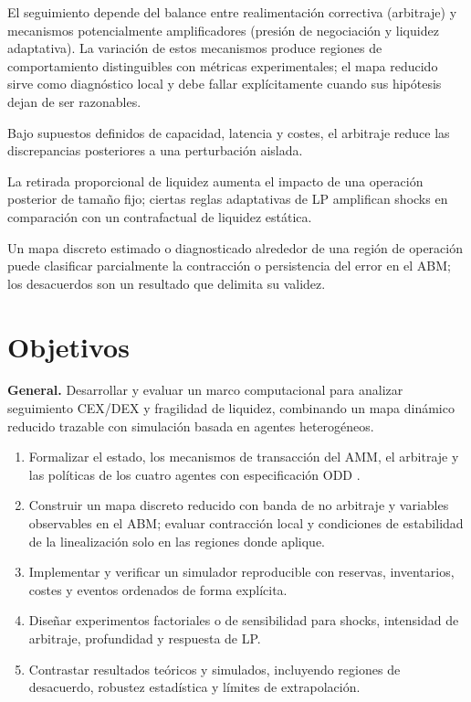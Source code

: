 El seguimiento depende del balance entre realimentación correctiva (arbitraje) y
mecanismos potencialmente amplificadores (presión de negociación y liquidez
adaptativa). La variación de estos mecanismos produce regiones de comportamiento
distinguibles con métricas experimentales; el mapa reducido sirve como diagnóstico
local y debe fallar explícitamente cuando sus hipótesis dejan de ser razonables.

\begin{description}[style=nextline]
  \item[H1a.] Bajo supuestos definidos de capacidad, latencia y costes, el arbitraje
    reduce las discrepancias posteriores a una perturbación aislada.
  \item[H1b.] La retirada proporcional de liquidez aumenta el impacto de una operación
    posterior de tamaño fijo; ciertas reglas adaptativas de LP amplifican shocks en
    comparación con un contrafactual de liquidez estática.
  \item[H1c.] Un mapa discreto estimado o diagnosticado alrededor de una región de
    operación puede clasificar parcialmente la contracción o persistencia del error en
    el ABM; los desacuerdos son un resultado que delimita su validez.
\end{description}

\section{Objetivos}

\textbf{General.} Desarrollar y evaluar un marco computacional para analizar seguimiento
CEX/DEX y fragilidad de liquidez, combinando un mapa dinámico reducido trazable con
simulación basada en agentes heterogéneos.

\begin{enumerate}
  \item Formalizar el estado, los mecanismos de transacción del AMM, el arbitraje y las
    políticas de los cuatro agentes con especificación ODD \cite{grimm2020odd}.
  \item Construir un mapa discreto reducido con banda de no arbitraje y variables
    observables en el ABM; evaluar contracción local y condiciones de estabilidad de la
    linealización solo en las regiones donde aplique.
  \item Implementar y verificar un simulador reproducible con reservas, inventarios,
    costes y eventos ordenados de forma explícita.
  \item Diseñar experimentos factoriales o de sensibilidad para shocks, intensidad de
    arbitraje, profundidad y respuesta de LP.
  \item Contrastar resultados teóricos y simulados, incluyendo regiones de desacuerdo,
    robustez estadística y límites de extrapolación.
\end{enumerate}
